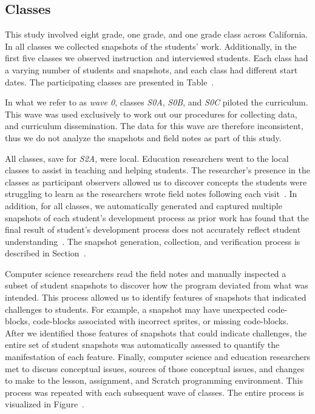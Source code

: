 \subsection{Classes} 
This study involved eight  grade, one  grade, and one 
grade class across California. In all classes we collected snapshots of the
students' work. Additionally, in the first five classes we observed instruction
and interviewed students. Each class had a varying number of students and
snapshots, and each class had different start dates. The participating classes
are presented in Table~.

In what we refer to as \emph{wave 0}, classes \emph{S0A}, \emph{S0B}, and
\emph{S0C} piloted the curriculum. This wave was used exclusively to work out
our procedures for collecting data, and curriculum dissemination. The data for
this wave are therefore inconsistent, thus we do not analyze the snapshots and
field notes as part of this study.

All classes, save for \emph{S2A}, were local. Education researchers went to the
local classes to assist in teaching and helping students. The researcher's
presence in the classes as participant observers allowed us to discover
concepts the students were struggling to learn as the researchers wrote field
notes following each visit~\cite{spradley80}. In addition, for all classes, we
automatically generated and captured multiple snapshots of each student's
development process as prior work has found that the final result of student's
development process does not accurately reflect student
understanding~\cite{Piech:2012:MSL:2157136.2157182,brennan12}. The snapshot
generation, collection, and verification process is described in
Section~.

Computer science researchers read the field notes and manually inspected a
subset of student snapshots to discover how the program deviated from what was
intended. This process allowed us to identify features of snapshots that
indicated challenges to students. For example, a snapshot may have unexpected
code-blocks, code-blocks associated with incorrect sprites, or missing
code-blocks.  After we identified those features of snapshots that could
indicate challenges, the entire set of student snapshots was automatically
assessed to quantify the manifestation of each feature. Finally, computer
science and education researchers met to discuss conceptual issues, sources of
those conceptual issues, and changes to make to the lesson, assignment, and
Scratch programming environment. This process was repeated with each subsequent
wave of classes. The entire process is visualized in
Figure~.

